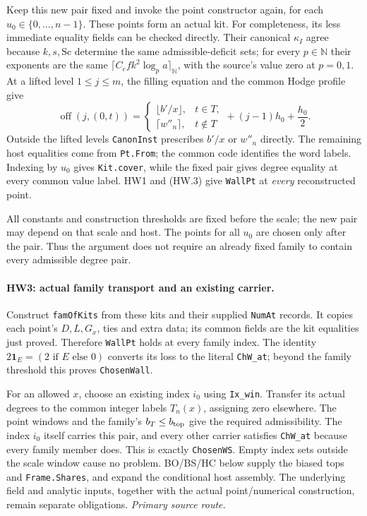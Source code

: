 \documentclass[11pt,a4paper]{article}
\numberwithin{equation}{section}
\theoremstyle{remark}\newtheorem{remark}[theorem]{Remark}
\begin{document}
Keep this new pair fixed and invoke the point constructor again, for
each $u_0\in\{0,\ldots,n-1\}$. These points form an actual kit.
For completeness, its less immediate equality fields can be checked
directly. Their canonical $\kappa_I$ agree because $k,s,\mathrm{Sc}$
determine the same admissible-deficit sets; for every $p\in\mathbb N$
their exponents are the same
$\lceil C_e f k^2\log_p a\rceil_{\mathbb N}$, with the source's
value zero at $p=0,1$. At a lifted level $1\le j\le m$,
the filling equation and the common Hodge profile give
\[
 \operatorname{off}(j,(0,t))=
 \begin{cases}\lfloor b'/x\rfloor,&t\in T,\\
               \lceil w''_n\rceil,&t\notin T
 \end{cases}
 +(j-1)h_0+\frac{h_0}{2}.                         \tag{HW.4}
\]
Outside the lifted levels \texttt{CanonInst} prescribes $b'/x$ or
$w''_n$ directly. The remaining host equalities come from
\texttt{Pt.From}; the common code identifies the word labels. Indexing
by $u_0$ gives \texttt{Kit.cover}, while the fixed pair gives degree
equality at every common value label. HW1 and (HW.3) give
\texttt{WallPt} at \emph{every} reconstructed point.

All constants and construction thresholds are fixed before the scale;
the new pair may depend on that scale and host. The points for all
$u_0$ are chosen only after the pair. Thus the argument does not require
an already fixed family to contain every admissible degree pair.

\paragraph{HW3: actual family transport and an existing carrier.}
Construct \texttt{famOfKits} from these kits and their supplied
\texttt{NumAt} records. It copies each point's $D,L,G_x$, ties and extra
data; its common fields are the kit equalities just proved. Therefore
\texttt{WallPt} holds at every family index. The identity
$2\mathbf1_E=(2\text{ if }E\text{ else }0)$ converts its loss to the
literal \texttt{ChW\_at}; beyond the family threshold this proves
\texttt{ChosenWall}.

For an allowed $x$, choose an existing index $i_0$ using
\texttt{Ix\_win}. Transfer its actual degrees to the common integer
labels $T_n(x)$, assigning zero elsewhere. The point windows and the
family's $b_T\le b_{\rm top}$ give the required admissibility. The
index $i_0$ itself carries this pair, and every other carrier satisfies
\texttt{ChW\_at} because every family member does. This is exactly
\texttt{ChosenWS}. Empty index sets outside the scale window cause no
problem. BO/BS/HC below supply the biased tops and
\texttt{Frame.Shares}, and expand the conditional host assembly.
The underlying field and analytic inputs, together with the actual
point/numerical construction, remain separate obligations.
\noindent\textit{Primary source route.}\cite{host-degree-realization}
\end{document}
